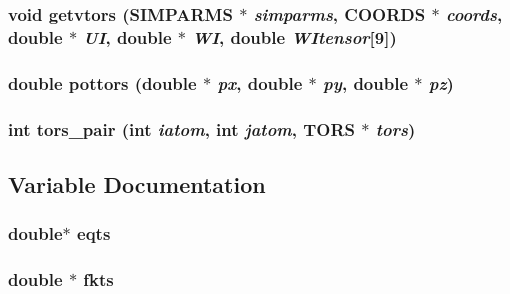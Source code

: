\subsubsection{\setlength{\rightskip}{0pt plus 5cm}void getvtors ({\bf SIMPARMS} $\ast$ {\em simparms}, {\bf COORDS} $\ast$ {\em coords}, double $\ast$ {\em UI}, double $\ast$ {\em WI}, double {\em WItensor}[9])}\label{md__ftors_8c_5d53446534788ac92ba5c425d2a2f98c}


\subsubsection{\setlength{\rightskip}{0pt plus 5cm}double pottors (double $\ast$ {\em px}, double $\ast$ {\em py}, double $\ast$ {\em pz})}\label{md__ftors_8c_03694fcdc1970009bc3557d77378bbeb}


\subsubsection{\setlength{\rightskip}{0pt plus 5cm}int tors\_\-pair (int {\em iatom}, int {\em jatom}, {\bf TORS} $\ast$ {\em tors})}\label{md__ftors_8c_c9fbc48b3c1fcdcf3e8b6a6d02e3915d}




\subsection{Variable Documentation}
\subsubsection{\setlength{\rightskip}{0pt plus 5cm}double$\ast$ {\bf eqts}\hspace{0.3cm}{\tt  [static]}}\label{md__ftors_8c_96dbf4ab8e7bf6ff9b511e29d7b804ed}


\subsubsection{\setlength{\rightskip}{0pt plus 5cm}double $\ast$ {\bf fkts}\hspace{0.3cm}{\tt  [static]}}\label{md__ftors_8c_bb3e76151e694218e6c6bad28a3ed53b}


